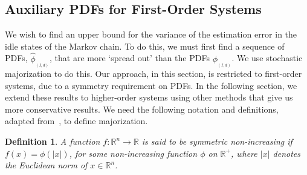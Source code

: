 \documentclass[twocolumn]{autart}
\newtheorem{definition}{Definition}[section]
\begin{document}
\subsection{Auxiliary PDFs for First-Order Systems} \label{SS:PDFmaj}

We wish to find an upper bound for the variance of the estimation error in the idle states of the Markov chain. To do this, we must first find a sequence of PDFs, $\hat{\phi}_{_{(I,d)}}$, that are more `spread out' than the PDFs $\phi_{_{(I,d)}}$. We use stochastic majorization to do this. Our approach, in this section, is restricted to first-order systems, due to a symmetry requirement on PDFs. In the following section, we extend these results to higher-order systems using other methods that give us more conservative results. We need the following notation and definitions, adapted from~\cite{Hajek2008}, to define majorization.

\begin{definition} \textbf{} \label{Def:SymmNIfunc}
A function $f:\mathbb{R}^n \rightarrow \mathbb{R}$ is said to be symmetric non-increasing if $f(x) = \phi(|x|)$, for some non-increasing function $\phi$ on $\mathbb{R}^+$, where $|x|$ denotes the Euclidean norm of $x \in \mathbb{R}^n$.
\end{definition}
\end{document}
